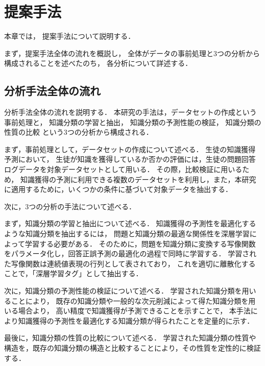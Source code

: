 \chapter{提案手法}
\label{chap:method}
\fancyhf{}
\rhead{\thepage}
\cfoot{\thepage}
本章では，
提案手法について説明する．

まず，提案手法全体の流れを概説し，
全体がデータの事前処理と3つの分析から構成されることを述べたのち，
各分析について詳述する．

\vvspace


\section{分析手法全体の流れ}
分析手法全体の流れを説明する．
本研究の手法は，データセットの作成という事前処理と，
知識分類の学習と抽出，
知識分類の予測性能の検証，
知識分類の性質の比較
という3つの分析から構成される．


まず，事前処理として，データセットの作成について述べる．
生徒の知識獲得予測において，
生徒が知識を獲得しているか否かの評価には，生徒の問題回答ログデータを対象データセットとして用いる．
その際，比較検証に用いるため，
知識獲得の予測に利用できる複数のデータセットを利用し，また，本研究に適用するために，いくつかの条件に基づいて対象データを抽出する．


次に，3つの分析の手法について述べる．

まず，知識分類の学習と抽出について述べる．
知識獲得の予測性を最適化するような知識分類を抽出するには，
問題と知識分類の最適な関係性を深層学習によって学習する必要がある．
そのために，問題を知識分類に変換する写像関数をパラメータ化し，回答正誤予測の最適化の過程で同時に学習する．
学習された写像関数は連続値表現の行列として表されており，
これを適切に離散化することで，「深層学習タグ」として抽出する．

次に，知識分類の予測性能の検証について述べる．
学習された知識分類を用いることにより，
既存の知識分類や一般的な次元削減によって得た知識分類を用いる場合より，
高い精度で知識獲得が予測できることを示すことで，
本手法により知識獲得の予測性を最適化する知識分類が得られたことを定量的に示す．

最後に，知識分類の性質の比較について述べる．
学習された知識分類の性質や構造を，既存の知識分類の構造と比較することにより，その性質を定性的に検証する．

